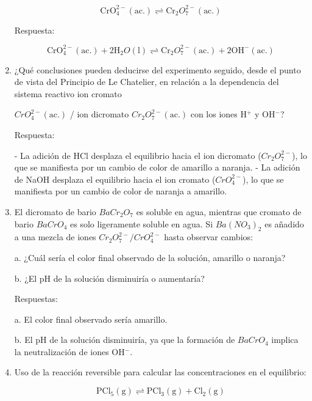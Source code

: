 \documentclass[11pt]{article}
\begin{document}
\begin{enumerate}
            \[ \text{CrO}_4^{2-} (\text{ac.}) \rightleftharpoons \text{Cr}_2O_7^{2-} (\text{ac.}) \]
            
            Respuesta:
            
            \[ \text{CrO}_4^{2-} (\text{ac.}) + 2 \text{H}_2O (\text{l}) \rightleftharpoons \text{Cr}_2O_7^{2-} (\text{ac.}) + 2 \text{OH}^- (\text{ac.}) \]
            
            \item ¿Qué conclusiones pueden deducirse del experimento seguido, desde el punto de vista del Principio de Le Chatelier, en relación a la dependencia del sistema reactivo ion cromato
            
            \(CrO_4^{2-} (\text{ac.})\) / ion dicromato \(Cr_2O_7^{2-} (\text{ac.})\) con los iones H\(^+\) y OH\(^-\)?
            
            Respuesta:
            
                - La adición de HCl desplaza el equilibrio hacia el ion dicromato (\(Cr_2O_7^{2-}\)), lo que se manifiesta por un cambio de color de amarillo a naranja.
                - La adición de NaOH desplaza el equilibrio hacia el ion cromato (\(CrO_4^{2-}\)), lo que se manifiesta por un cambio de color de naranja a amarillo.
            
            \item El dicromato de bario \(BaCr_2O_7\) es soluble en agua, mientras que cromato de bario \(BaCrO_4\) es solo ligeramente soluble en agua. Si \(Ba(NO_3)_2\) es añadido a una mezcla de iones \(Cr_2O_7^{2-} / CrO_4^{2-}\) hasta observar cambios:
            
            a. ¿Cuál sería el color final observado de la solución, amarillo o naranja?
            
            b. ¿El pH de la solución disminuiría o aumentaría?
            
            Respuestas:
            
            a. El color final observado sería amarillo.
            
            b. El pH de la solución disminuiría, ya que la formación de \(BaCrO_4\) implica la neutralización de iones OH$^-$.

            
            \item Uso de la reacción reversible para calcular las concentraciones en el equilibrio:

            \[ \text{PCl}_5 (\text{g}) \rightleftharpoons \text{PCl}_3 (\text{g}) + \text{Cl}_2 (\text{g}) \]


\end{enumerate}
\end{document}
